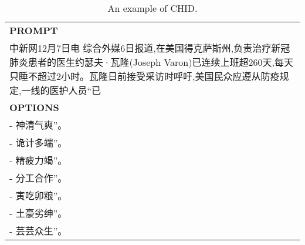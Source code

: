 \begin{table}[ht]
    \centering \small
\begin{tabular}{p{12cm}}
\toprule
\textbf{PROMPT}\\
中新网12月7日电 综合外媒6日报道,在美国得克萨斯州,负责治疗新冠肺炎患者的医生约瑟夫·瓦隆(Joseph Varon)已连续上班超260天,每天只睡不超过2小时。瓦隆日前接受采访时呼吁,美国民众应遵从防疫规定,一线的医护人员“已\\
\midrule
\textbf{OPTIONS}\\
- 神清气爽”。\\
- 诡计多端”。\\
- 精疲力竭”。\\
- 分工合作”。\\
- 寅吃卯粮”。\\
- 土豪劣绅”。\\
- 芸芸众生”。\\
\bottomrule
\end{tabular}
    \caption{\centering An example of CHID.}
    \label{tab:chid_eval_format_example}
\end{table}

